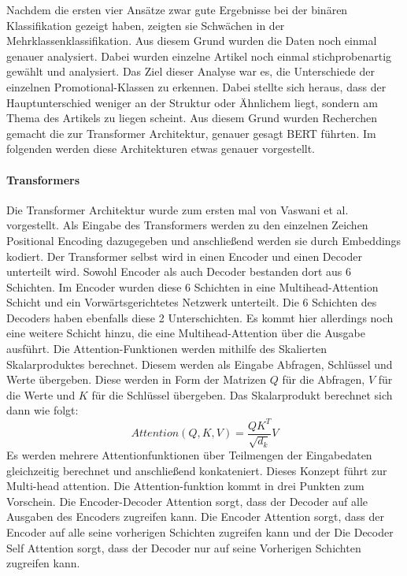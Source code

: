 Nachdem die ersten vier Ansätze zwar gute Ergebnisse bei der binären Klassifikation gezeigt haben, zeigten sie Schwächen in der Mehrklassenklassifikation. Aus diesem Grund wurden die Daten noch einmal genauer analysiert. Dabei wurden einzelne Artikel noch einmal stichprobenartig gewählt und analysiert. Das Ziel dieser Analyse war es, die Unterschiede der einzelnen Promotional-Klassen zu erkennen. Dabei stellte sich heraus, dass der Hauptunterschied weniger an der Struktur oder Ähnlichem liegt, sondern am Thema des Artikels zu liegen scheint. Aus diesem Grund wurden Recherchen gemacht die zur Transformer Architektur, genauer gesagt BERT führten. Im folgenden werden diese Architekturen etwas genauer vorgestellt.
\paragraph{Transformers}
Die Transformer Architektur wurde zum ersten mal von Vaswani et al. \cite{Vaswani2017} vorgestellt. Als Eingabe des Transformers werden zu den einzelnen Zeichen Positional Encoding dazugegeben und anschließend werden sie durch Embeddings kodiert. Der Transformer selbst wird in einen Encoder und einen Decoder unterteilt wird. Sowohl Encoder als auch Decoder bestanden dort aus 6 Schichten. Im Encoder wurden diese 6 Schichten in eine Multihead-Attention Schicht und ein Vorwärtsgerichtetes Netzwerk unterteilt. Die 6 Schichten des Decoders haben ebenfalls diese 2 Unterschichten. Es kommt hier allerdings noch eine weitere Schicht hinzu, die eine Multihead-Attention über die Ausgabe ausführt. Die Attention-Funktionen werden mithilfe des Skalierten Skalarproduktes berechnet. Diesem werden als Eingabe Abfragen, Schlüssel und Werte übergeben. Diese werden in Form der Matrizen $Q$ für die Abfragen, $V$ für die Werte und $K$ für die Schlüssel übergeben. Das Skalarprodukt berechnet sich dann wie folgt:
$${Attention(Q,K,V)} = {\frac{QK^T}{\sqrt{d_k}} V}$$
Es werden mehrere Attentionfunktionen über Teilmengen der Eingabedaten gleichzeitig berechnet und anschließend konkateniert. Dieses Konzept führt zur Multi-head attention. Die Attention-funktion kommt in drei Punkten zum Vorschein. Die Encoder-Decoder Attention sorgt, dass der Decoder auf alle Ausgaben des Encoders zugreifen kann. Die Encoder Attention sorgt, dass der Encoder auf alle seine vorherigen Schichten zugreifen kann und der Die Decoder Self Attention sorgt, dass der Decoder nur auf seine Vorherigen Schichten zugreifen kann.
